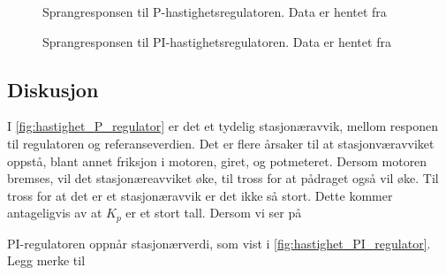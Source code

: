 
\begin{figure}[h!]
    \centering
    
    \caption{Sprangresponsen til P-hastighetsregulatoren. Data er hentet fra \cite{EksempelData}}
    \label{fig:hastighet_P_regulator}
\end{figure}

\begin{figure}[h!]
    \centering
    
    \caption{Sprangresponsen til PI-hastighetsregulatoren. Data er hentet fra \cite{EksempelData}}
    \label{fig:hastighet_PI_regulator}
\end{figure}

\subsection{Diskusjon}

I \autoref{fig:hastighet_P_regulator} er det et tydelig stasjonæravvik, mellom responen til regulatoren og referanseverdien. Det er flere årsaker til at stasjonværavviket oppstå, blant annet friksjon i motoren, giret, og potmeteret. Dersom motoren bremses, vil det stasjonæreavviket øke, til tross for at pådraget også vil øke.
Til tross for at det er et stasjonæravvik er det ikke så stort. Dette kommer antageligvis av at $K_p$ er et stort tall. Dersom vi ser på 

PI-regulatoren oppnår stasjonærverdi, som vist i \autoref{fig:hastighet_PI_regulator}. Legg merke til
